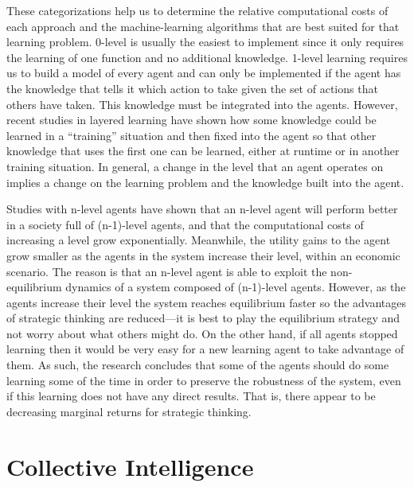 These categorizations help us to determine the relative computational
costs of each approach and the machine-learning algorithms that are
best suited for that learning problem. 0-level is usually the easiest
to implement since it only requires the learning of one function and
no additional knowledge. 1-level learning requires us to build a model
of every agent and can only be implemented if the agent has the
knowledge that tells it which action to take given the set of actions
that others have taken. This knowledge must be integrated into the
agents. However, recent studies in layered learning \cite{stone00a}
have shown how some knowledge could be learned in a ``training''
situation and then fixed into the agent so that other knowledge that
uses the first one can be learned, either at runtime or in another
training situation. In general, a change in the level that an agent
operates on implies a change on the learning problem and the knowledge
built into the agent.

Studies with n-level agents have shown \cite{vidal:98b} that an
n-level agent will perform better in a society full of (n-1)-level
agents, and that the computational costs of increasing a level grow
exponentially.  Meanwhile, the utility gains to the agent grow smaller
as the agents in the system increase their level, within an economic
scenario. The reason is that an n-level agent is able to exploit the
non-equilibrium dynamics of a system composed of (n-1)-level agents.
However, as the agents increase their level the system reaches
equilibrium faster so the advantages of strategic thinking are
reduced---it is best to play the equilibrium strategy and not worry
about what others might do. On the other hand, if all agents stopped
learning then it would be very easy for a new learning agent to take
advantage of them. As such, the research concludes that some of the
agents should do some learning some of the time in order to preserve
the robustness of the system, even if this learning does not have any
direct results. That is, there appear to be decreasing marginal
returns for strategic thinking.


\section{Collective Intelligence}
\label{sec:coin}

